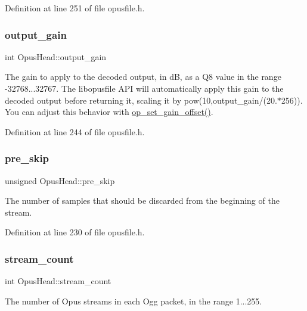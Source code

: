 Definition at line 251 of file opusfile.\+h.

\mbox{\label{struct_opus_head_a1f1c9e144ab05fe281f088d3e73eeab2}} 
\subsubsection{\texorpdfstring{output\_gain}{output\_gain}}
{\footnotesize\ttfamily int Opus\+Head\+::output\+\_\+gain}

The gain to apply to the decoded output, in dB, as a Q8 value in the range -\/32768...32767. The {\ttfamily libopusfile} A\+PI will automatically apply this gain to the decoded output before returning it, scaling it by {\ttfamily pow(10,output\+\_\+gain/(20.$\ast$256))}. You can adjust this behavior with \mbox{\hyperlink{group__stream__decoding_ga7df927613ccf57996319678e08513289}{op\+\_\+set\+\_\+gain\+\_\+offset()}}. 

Definition at line 244 of file opusfile.\+h.

\mbox{\label{struct_opus_head_ab448d3d3289d99f01dca8f19e878d57f}} 
\subsubsection{\texorpdfstring{pre\_skip}{pre\_skip}}
{\footnotesize\ttfamily unsigned Opus\+Head\+::pre\+\_\+skip}

The number of samples that should be discarded from the beginning of the stream. 

Definition at line 230 of file opusfile.\+h.

\mbox{\label{struct_opus_head_a241b040792d2181f3ff6fa7e9911ac40}} 
\subsubsection{\texorpdfstring{stream\_count}{stream\_count}}
{\footnotesize\ttfamily int Opus\+Head\+::stream\+\_\+count}

The number of Opus streams in each Ogg packet, in the range 1...255. 

